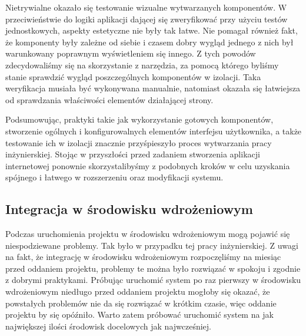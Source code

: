 \documentclass[a4paper,11pt,twoside]{report}
\theoremstyle{definition}
\begin{document}
            Nietrywialne okazało się testowanie wizualne wytwarzanych komponentów. W przeciwieństwie do logiki aplikacji dającej się zweryfikować przy użyciu testów jednostkowych, aspekty estetyczne nie były tak łatwe. Nie pomagał również fakt, że komponenty były zależne od siebie i czasem dobry wygląd jednego z nich był warunkowany poprawnym wyświetleniem się innego.
            Z tych powodów zdecydowaliśmy się na skorzystanie z narzędzia, za pomocą którego byliśmy stanie sprawdzić wygląd poszczególnych komponentów w izolacji. Taka weryfikacja musiała być wykonywana manualnie, natomiast okazała się łatwiejsza od sprawdzania właściwości elementów działającej strony.
            
            Podsumowując, praktyki takie jak wykorzystanie gotowych komponentów, stworzenie ogólnych i konfigurowalnych elementów interfejsu użytkownika, a także testowanie ich w izolacji znacznie przyśpieszyło proces wytwarzania pracy inżynierskiej.
            Stojąc w przyszłości przed zadaniem stworzenia aplikacji internetowej ponownie skorzystalibyśmy z podobnych kroków w celu uzyskania spójnego i łatwego w rozszerzeniu oraz modyfikacji systemu.
        
        \subsection{Integracja w środowisku wdrożeniowym}
            Podczas uruchomienia projektu w środowisku wdrożeniowym mogą pojawić się niespodziewane problemy. Tak było w przypadku tej pracy inżynierskiej. Z uwagi na fakt, że integrację w środowisku wdrożeniowym rozpoczęliśmy na miesiąc przed oddaniem projektu, problemy te można było rozwiązać w spokoju i zgodnie z dobrymi praktykami.
            Próbując uruchomić system po raz pierwszy w środowisku wdrożeniowym niedługo przed oddaniem projektu mogłoby się okazać, że powstałych problemów nie da się rozwiązać w krótkim czasie, więc oddanie projektu by się opóźniło.
            Warto zatem próbować uruchomić system na jak największej ilości środowisk docelowych jak najwcześniej.
            
\end{document}
